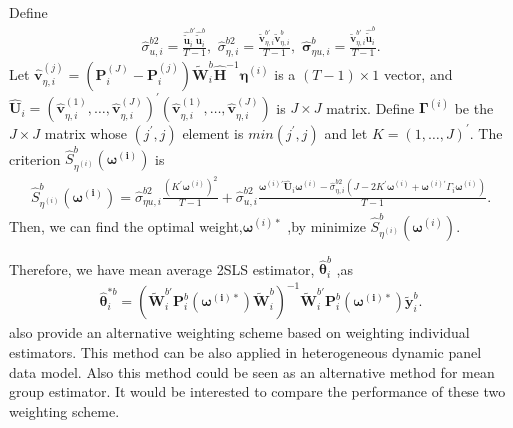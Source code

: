 \documentclass[12pt,a4paper,hyperref]{article}
\begin{document}
 Define
 \begin{align}
 \hat{\sigma}^{b 2}_{u, i}=\frac{\hat{\tilde{\boldsymbol{u}}}^{b'}_{i} \hat{\tilde{\boldsymbol{u}}}^{b}_{i}}{T-1}, \,\, \hat{\sigma}^{b2}_{\eta, i}=\frac{\tilde{\boldsymbol{v}}^{b '}_{\eta, i} \tilde{\boldsymbol{v}}^{b}_{\eta, i}}{T-1}, \,\, \hat{\boldsymbol{\sigma}}^{b}_{\eta u, i}=\frac{\tilde{\boldsymbol{v}}^{b'}_{\eta, i} \hat{\tilde{\boldsymbol{u}}}^{b}_{i}}{T-1}.
 \end{align}
 Let $\hat{\boldsymbol{v}}^{(j)}_{\eta, i}=\left(\boldsymbol{P}_{i}^{(J)}- \boldsymbol{P}_{i}^{(j)}\right)\tilde{\boldsymbol{W}}^{b}_{i}  \hat{\boldsymbol{H}}^{-1}\boldsymbol{\eta}^{(i)}$ is a $(T-1) \times 1$ vector, and $\hat{\boldsymbol{U}}_{i}=\left(\hat{\boldsymbol{v}}^{(1)}_{\eta, i}, \ldots, \hat{\boldsymbol{v}}^{(J)}_{\eta, i} \right)^{'}\left(\hat{\boldsymbol{v}}^{(1)}_{\eta, i}, \ldots, \hat{\boldsymbol{v}}^{(J)}_{\eta, i} \right)$ is $J \times J$ matrix. Define $\boldsymbol{\Gamma}^{(i)}$ be the $J \times J$ matrix whose $(j^{'}, j)$ element is $min(j^{'}, j)$ and let $K=(1, \ldots, J)^{'}$. The criterion $\hat{S}^{b}_{\eta^{(i)}}\left(\boldsymbol{\omega^{(i)}} \right)$ is
 \begin{align}
 \hat{S}^{b}_{\eta^{(i)}}\left(\boldsymbol{\omega^{(i)}} \right)=\hat{\sigma}^{b 2}_{\eta u, i} \frac{(K^{'}\boldsymbol{\omega}^{(i)})^{2}}{T-1}+\hat{\sigma}^{b2}_{u,i}\frac{\boldsymbol{\omega}^{(i)'}\hat{\boldsymbol{U}}_{i}\boldsymbol{\omega}^{(i)}-\hat{\sigma}^{b 2}_{\eta, i}(J-2K^{'}\boldsymbol{\omega}^{(i)}+\boldsymbol{\omega}^{(i)'}\Gamma_{i} \boldsymbol{\omega}^{(i)})}{T-1}.
 \end{align}
 Then, we can find the optimal weight,$\boldsymbol{\omega}^{(i)\ast}$ ,by minimize $\hat{S}^{b}_{\eta^{(i)}}(\boldsymbol{\omega}^{(i)})$.

Therefore, we have mean average 2SLS estimator, $\hat{\boldsymbol{\theta}}^{b}_{i}$ ,as
\begin{align}
\hat{\boldsymbol{\theta}}^{\ast b}_{i}= \left( \tilde{\boldsymbol{W}}^{b'}_{i}\boldsymbol{P}^{b}_{i}\left(\boldsymbol{\omega^{(i)\ast}} \right)\tilde{\boldsymbol{W}}^{b}_{i} \right)^{-1} \tilde{\boldsymbol{W}}^{b'}_{i}\boldsymbol{P}^{b}_{i}\left(\boldsymbol{\omega^{(i)\ast}} \right) \tilde{\boldsymbol{y}}^{b}_{i}.
\end{align}
\citet{Xiaohong:2016} also provide an alternative weighting scheme based on weighting individual estimators. This method can be also applied in heterogeneous dynamic panel data model. Also this method could be seen as an alternative method for mean group estimator. It would be interested to compare the performance of these two weighting scheme.  
\end{document}
